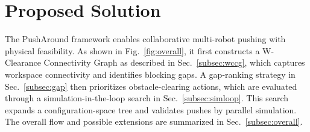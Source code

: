 \section{Proposed Solution}\label{sec:solution}

The PushAround framework enables collaborative multi-robot pushing with physical 
feasibility. As shown in Fig.~\ref{fig:overall},
it first constructs a W-Clearance Connectivity Graph as described in 
Sec.~\ref{subsec:wccg}, which captures workspace connectivity and identifies 
blocking gaps. A gap-ranking strategy in Sec.~\ref{subsec:gap} then prioritizes 
obstacle-clearing actions, which are evaluated through a simulation-in-the-loop 
search in Sec.~\ref{subsec:simloop}. This search expands a configuration-space 
tree and validates pushes by parallel simulation. The overall flow and possible 
extensions are summarized in Sec.~\ref{subsec:overall}.








